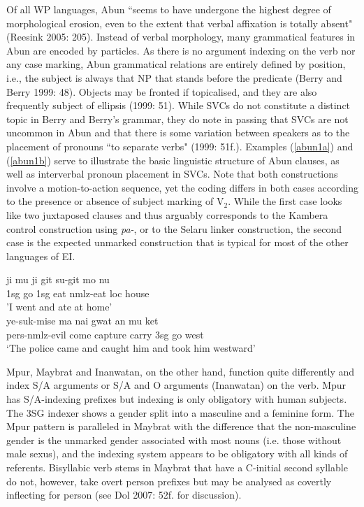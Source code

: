 Of all WP languages, Abun ``seems to have undergone the highest degree of morphological erosion, even to the extent that verbal affixation is totally absent" (Reesink 2005: 205). Instead of verbal morphology, many grammatical features in Abun are encoded by particles. As there is no argument indexing on the verb nor any case marking, Abun grammatical relations are entirely defined by position, i.e., the subject is always that NP that stands before the predicate (Berry and Berry 1999: 48). Objects may be fronted if topicalised, and they are also frequently subject of ellipsis (1999: 51). While SVCs do not constitute a distinct topic in Berry and Berry's grammar, they do note in passing that SVCs are not uncommon in Abun and that there is some variation between speakers as to the placement of pronouns ``to separate verbs" (1999: 51f.). Examples (\ref{abun1a}) and (\ref{abun1b}) serve to illustrate the basic linguistic structure of Abun clauses, as well as interverbal pronoun placement in SVCs. Note that both constructions involve a motion-to-action sequence, yet the coding differs in both cases according to the presence or absence of subject marking of V$_2$. While the first case looks like two juxtaposed clauses and thus arguably corresponds to the Kambera control construction using \textit{pa-}, or to the Selaru linker construction, the second case is the expected unmarked construction that is typical for most of the other languages of EI.

\pex 
\a \label{abun1a}
\gll ji mu ji git su-git mo nu \\
\acs{1}\acs{sg} go \acs{1}\acs{sg} eat \acs{nmlz}-eat \acs{loc} house \\
\glft 'I went and ate at home' \\ 
\endgl
\a \label{abun1b}
\gla ye-suk-mise ma nai gwat an mu ket \\ 
\acs{pers}-\acs{nmlz}-evil come capture carry \acs{3}\acs{sg} go west \\
\glft `The police came and caught him and took him westward' \\ 
\endgl
\xe

Mpur, Maybrat and Inanwatan, on the other hand, function quite differently and index S/A arguments or S/A and O arguments (Inanwatan) on the verb. Mpur has S/A-indexing prefixes but indexing is only obligatory with human subjects. The 3SG indexer shows a gender split into a masculine and a feminine form. The Mpur pattern is paralleled in Maybrat with the difference that the non-masculine gender is the unmarked gender associated with most nouns (i.e. those without male sexus), and the indexing system appears to be obligatory with all kinds of referents. Bisyllabic verb stems in Maybrat that have a C-initial second syllable do not, however, take overt person prefixes but may be analysed as covertly inflecting for person (see Dol 2007: 52f. for discussion).

